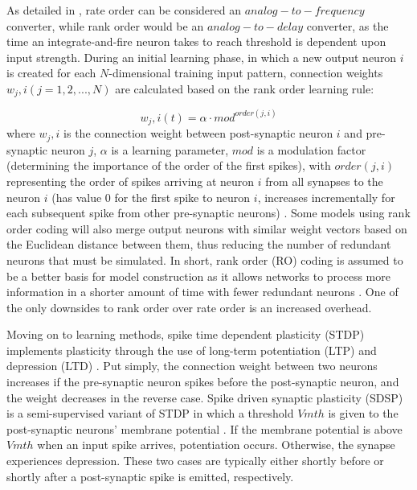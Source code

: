 \documentclass[journal]{./sty/IEEEtran}
\begin{document}
As detailed in \cite{RO:Thorpe}, rate order can be considered an $analog-to-frequency$ converter, while rank order would be an $analog-to-delay$ converter, as the time an integrate-and-fire neuron takes to reach threshold is dependent upon input strength. 
During an initial learning phase, in which a new output neuron $i$ is created for each $N$-dimensional training input pattern, connection weights $w_j,i (j = 1,2,...,N)$ are calculated based on the rank order learning rule:

\begin{equation}
w_j,i(t) = {\alpha}\cdot{mod^{order(j,i)}} 
\end{equation} 
where $w_j,i$ is the connection weight between post-synaptic neuron $i$ and pre-synaptic neuron $j$, $\alpha$ is a learning parameter, $mod$ is a modulation factor (determining the importance of the order of the first spikes), with $order(j,i)$ representing the order of spikes arriving at neuron $i$ from all synapses to the neuron $i$ (has value $0$ for the first spike to neuron $i$, increases incrementally for each subsequent spike from other pre-synaptic neurons) \cite{deSNN:Kasabov}.
Some models using rank order coding will also merge output neurons with similar weight vectors based on the Euclidean distance between them, thus reducing the number of redundant neurons that must be simulated.
In short, rank order (RO) coding is assumed to be a better basis for model construction as it allows networks to process more information in a shorter amount of time with fewer redundant neurons \cite{RO:Thorpe}.
One of the only downsides to rank order over rate order is an increased overhead.

Moving on to learning methods, spike time dependent plasticity (STDP) implements plasticity 
through the use of long-term potentiation (LTP) and depression (LTD) \cite{FBBPSTDP:Davies, FBSTDP:Davies, STDPonset:Humble}.
Put simply, the connection weight between two neurons increases 
if the pre-synaptic neuron spikes before the post-synaptic neuron, 
and the weight decreases in the reverse case.  
Spike driven synaptic plasticity (SDSP) is a semi-supervised variant of STDP 
in which a threshold $Vmth$ is given to the post-synaptic neurons' membrane potential \cite{deSNN:Kasabov}.
If the membrane potential is above $Vmth$ when an input spike arrives, potentiation occurs. 
Otherwise, the synapse experiences depression.
These two cases are typically either shortly before or shortly after a post-synaptic 
spike is emitted, respectively. 
\end{document}
